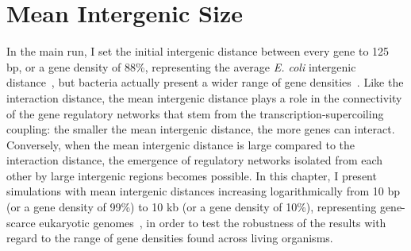\section{Mean Intergenic Size}

In the main run, I set the initial intergenic distance between every gene to 125 bp, or a gene density of 88\%, representing the average \emph{E. coli} intergenic distance~\citep{postow2004}, but bacteria actually present a wider range of gene densities~\citep{kuo2009}.
Like the interaction distance, the mean intergenic distance plays a role in the connectivity of the gene regulatory networks that stem from the transcription-supercoiling coupling: the smaller the mean intergenic distance, the more genes can interact.
Conversely, when the mean intergenic distance is large compared to the interaction distance, the emergence of regulatory networks isolated from each other by large intergenic regions becomes possible.
In this chapter, I present simulations with mean intergenic distances increasing logarithmically from 10 bp (or a gene density of 99\%) to 10 kb (or a gene density of 10\%), representing gene-scarce eukaryotic genomes~\citep{davilalopez2010}, in order to test the robustness of the results with regard to the range of gene densities found across living organisms.

